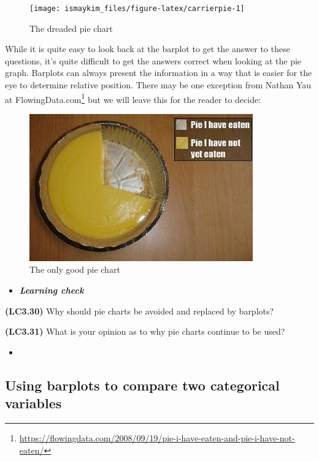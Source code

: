 \documentclass[12pt,]{krantz}
\renewcommand{\href}[2]{#2\footnote{\url{#1}}}
\newenvironment{rmdblock}[1]
  {\begin{shaded*}
  \begin{itemize}
  \renewcommand{\labelitemi}{
    \raisebox{-.7\height}[0pt][0pt]{
    }
  }
  \item
  }
  {
  \end{itemize}
  \end{shaded*}
  }
\newenvironment{learncheck}
  {\begin{rmdblock}{warning}}
  {\end{rmdblock}}
\theoremstyle{definition}
\theoremstyle{definition}
\theoremstyle{definition}
\theoremstyle{remark}
\begin{document}
\begin{figure}

{\centering \texttt{[image: ismaykim\_files/figure-latex/carrierpie-1]} 

}

\caption{The dreaded pie chart}\label{fig:carrierpie}
\end{figure}

While it is quite easy to look back at the barplot to get the answer to
these questions, it's quite difficult to get the answers correct when
looking at the pie graph. Barplots can always present the information in
a way that is easier for the eye to determine relative position. There
may be one exception from Nathan Yau at
\href{https://flowingdata.com/2008/09/19/pie-i-have-eaten-and-pie-i-have-not-eaten/}{FlowingData.com}
but we will leave this for the reader to decide:

\begin{figure}

{\centering \includegraphics[width=\textwidth,height=2.5in]{images/Pie-I-have-Eaten} 

}

\caption{The only good pie chart}\label{fig:unnamed-chunk-49}
\end{figure}

\begin{learncheck}
\textbf{\emph{Learning check}}
\end{learncheck}

\textbf{(LC3.30)} Why should pie charts be avoided and replaced by
barplots?

\textbf{(LC3.31)} What is your opinion as to why pie charts continue to
be used?

\begin{learncheck}

\end{learncheck}

\subsection{Using barplots to compare two categorical
variables}\label{using-barplots-to-compare-two-categorical-variables}
\end{document}
